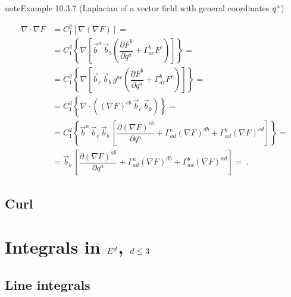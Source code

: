 \documentclass[letterpaper,10pt,english]{jupyterBook}
\begin{document}
\label{ch/tensor-algebra-calculus/calculus-euclidean:example-10}
\begin{sphinxadmonition}{note}{Example 10.3.7 (Laplacian of a vector field \sphinxhyphen{} with general coordinates \protect\(q^a\protect\))}


\begin{equation*}
\begin{split}
\nabla \cdot \nabla F
  & = C_{1}^2 \left[ \nabla \left( \nabla F \right) \right] = \\
  & = C_{1}^2 \left\{ \nabla \left[ \vec{b}^a \, \vec{b}_b \left( \dfrac{\partial F^b}{\partial q^a} + \Gamma^{b}_{ac} F^c \right) \right] \right\} = \\
  & = C_{1}^2 \left\{ \nabla \left[ \vec{b}_c \, \vec{b}_b \,  g^{ac} \left( \dfrac{\partial F^b}{\partial q^a} + \Gamma^{b}_{ac} F^c \right) \right] \right\} = \\
  & = C_{1}^2 \left\{ \nabla \cdot \left((\nabla F)^{cb} \, \vec{b}_c \, \vec{b}_b \right) \right\} = \\
  & = C_{1}^2 \left\{ \vec{b}^a \, \vec{b}_c \, \vec{b}_b \, \left[ \dfrac{\partial (\nabla F)^{cb}}{\partial q^a} 
     + \Gamma_{ad}^c (\nabla F)^{db} + \Gamma_{ad}^b (\nabla F)^{cd} \right] \right\} = \\
  & = \vec{b}_b \, \left[ \dfrac{\partial (\nabla F)^{ab}}{\partial q^a} 
     + \Gamma_{ad}^a (\nabla F)^{db} + \Gamma_{ad}^b (\nabla F)^{ad} \right] = \ .
\end{split}
\end{equation*}\end{sphinxadmonition}


\subsection{Curl}
\label{\detokenize{ch/tensor-algebra-calculus/calculus-euclidean:curl}}\label{\detokenize{ch/tensor-algebra-calculus/calculus-euclidean:tensor-calculus-differential-operators-curl}}

\section{Integrals in \protect\(E^d\protect\), \protect\(d \le 3\protect\)}
\label{\detokenize{ch/tensor-algebra-calculus/calculus-euclidean:integrals-in-e-d-d-le-3}}\label{\detokenize{ch/tensor-algebra-calculus/calculus-euclidean:tensor-calculus-integrals}}

\subsection{Line integrals}
\label{\detokenize{ch/tensor-algebra-calculus/calculus-euclidean:line-integrals}}\label{\detokenize{ch/tensor-algebra-calculus/calculus-euclidean:tensor-calculus-integrals-line}}
\end{document}
